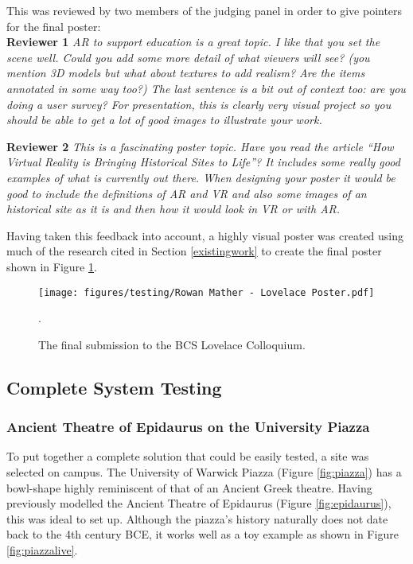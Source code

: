 \documentclass[12pt, a4paper]{article}
\begin{document}
This was reviewed by two members of the judging panel in order to give pointers for the final poster:\\
\textbf{Reviewer 1}
\textit{AR to support education is a great topic. I like that you set the scene well. Could you add some more detail of what viewers will see? (you mention 3D models but what about textures to add realism? Are the items annotated in some way too?) The last sentence is a bit out of context too: are you doing a user survey? For presentation, this is clearly very visual project so you should be able to get a lot of good images to illustrate your work.}

\textbf{Reviewer 2}
\textit{This is a fascinating poster topic. Have you read the article ``How Virtual Reality is Bringing Historical Sites to Life''? \cite{testing:reviewerpaper} It includes some really good examples of what is currently out there. When designing your poster it would be good to include the definitions of AR and VR and also some images of an historical site as it is and then how it would look in VR or with AR.}

Having taken this feedback into account, a highly visual poster was created using much of the research cited in Section \ref{existingwork} to create the final poster shown in Figure \ref{fig:bcsposter}. 

\begin{figure}[h]
\centering
    \texttt{[image: figures/testing/Rowan Mather - Lovelace Poster.pdf]}
        \caption{The final submission to the BCS Lovelace Colloquium.}.
        \label{fig:bcsposter}
\end{figure}

\newpage
\subsection{Complete System Testing}

\subsubsection{Ancient Theatre of Epidaurus on the University Piazza}
To put together a complete solution that could be easily tested, a site was selected on campus. The University of Warwick Piazza (Figure \ref{fig:piazza}) has a bowl-shape highly reminiscent of that of an Ancient Greek theatre. Having previously modelled the Ancient Theatre of Epidaurus (Figure \ref{fig:epidaurus}), this was ideal to set up. Although the piazza's history naturally does not date back to the 4th century BCE, it works well as a toy example as shown in Figure \ref{fig:piazzalive}.
\end{document}
